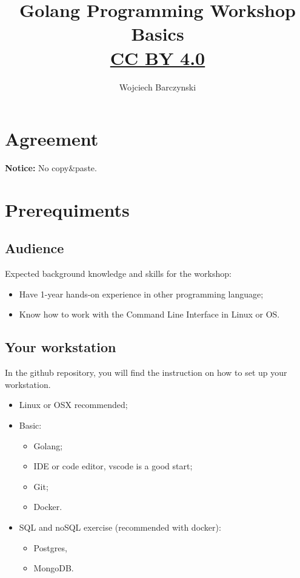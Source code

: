 \documentclass[11pt, letterpaper]{article}
\title{Golang Programming Workshop\\Basics\\{ \small \href{https://creativecommons.org/licenses/by/4.0/}{CC BY 4.0} }  }
\author{Wojciech Barczynski}
\date{}
\begin{document}

\begin{titlepage}
\maketitle
\end{titlepage}

\tableofcontents
\pagebreak

\section{Agreement}

\bigskip
\textbf{Notice:} No copy\&paste.
\bigskip

\section{Prerequiments}

\subsection{Audience}

Expected background knowledge and skills for the workshop:

\begin{itemize}%
\item Have 1-year hands-on experience in other programming language;%
\item Know how to work with the Command Line Interface in Linux or OS.
\end{itemize}%

\subsection{Your workstation}

In the github repository, you will find the instruction on how to set up your workstation.

\begin{itemize}%
\item Linux or {\small OSX} recommended;%
\item Basic: \begin{itemize}%
    \item Golang;
    \item {\small IDE} or code editor, vscode is a good start;
    \item Git;
    \item Docker.
    \end{itemize}%
\item {\small SQL} and no{\small SQL} exercise (recommended with docker):
\begin{itemize}%
    \item Postgres,
    \item MongoDB.
\end{itemize}
\end{itemize}
\end{document}
